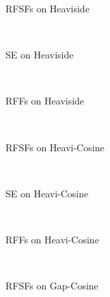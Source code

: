	\begin{figure*}
		\centering
		\begin{subfigure}{0.32\linewidth}
			\centering
			\imageResultsGpHeavisideRfsf
			\caption{\acsp{RFSF} on Heaviside}
		\end{subfigure}
		~
		\begin{subfigure}{0.32\linewidth}
			\centering
			\imageResultsGpHeavisideRbf
			\caption{\acs{SE} on Heaviside}
			\label{fig:syntheticResultPlotSeHeaviside}
		\end{subfigure}
		~
		\begin{subfigure}{0.32\linewidth}
			\centering
			\imageResultsGpHeavisideRff
			\caption{\acsp{RFF} on Heaviside}
		\end{subfigure}
		\\[0.4cm]
		\begin{subfigure}{0.32\linewidth}
			\centering
			\imageResultsGpHeavicosineRfsf
			\caption{\acsp{RFSF} on Heavi-Cosine}
		\end{subfigure}
		~
		\begin{subfigure}{0.32\linewidth}
			\centering
			\imageResultsGpHeavicosineRbf
			\caption{\acs{SE} on Heavi-Cosine}
			\label{fig:syntheticResultPlotSeHeaviCosine}
		\end{subfigure}
		~
		\begin{subfigure}{0.32\linewidth}
			\centering
			\imageResultsGpHeavicosineRff
			\caption{\acsp{RFF} on Heavi-Cosine}
		\end{subfigure}
		\\[0.4cm]
		\begin{subfigure}{0.32\linewidth}
			\centering
			\imageResultsGpGapcosineRfsf
			\caption{\acsp{RFSF} on Gap-Cosine}
			\label{fig:syntheticResultPlotRfsfGapCosine}
		\end{subfigure}
		~
		\begin{subfigure}{0.32\linewidth}

\end{subfigure}
\end{figure*}
